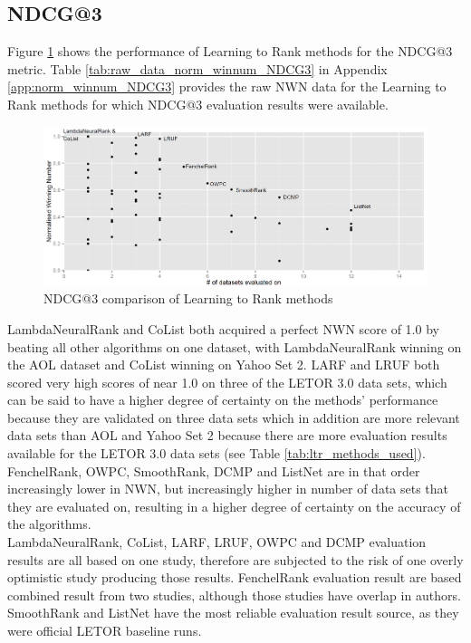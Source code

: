 \subsection{NDCG@3}
Figure \ref{fig:normalised_winning_number_NDCG3} shows the performance of Learning to Rank methods for the \ac{NDCG}@3 metric. Table \ref{tab:raw_data_norm_winnum_NDCG3} in Appendix \ref{app:norm_winnum_NDCG3} provides the raw \ac{NWN} data for the Learning to Rank methods for which \ac{NDCG}@3 evaluation results were available.\\

\begin{figure}[!h]
\includegraphics[scale=0.285]{gfx/ndcg3_winnum}
\caption{\acs{NDCG}@3 comparison of Learning to Rank methods}
\label{fig:normalised_winning_number_NDCG3}
\end{figure}

LambdaNeuralRank and CoList both acquired a perfect \ac{NWN} score of 1.0 by beating all other algorithms on one dataset, with LambdaNeuralRank winning on the AOL dataset and CoList winning on Yahoo Set 2. LARF and LRUF both scored very high scores of near 1.0 on three of the LETOR 3.0 data sets, which can be said to have a higher degree of certainty on the methods' performance because they are validated on three data sets which in addition are more relevant data sets than AOL and Yahoo Set 2 because there are more evaluation results available for the LETOR 3.0 data sets (see Table \ref{tab:ltr_methods_used}). FenchelRank, OWPC, SmoothRank, DCMP and ListNet are in that order increasingly lower in \ac{NWN}, but increasingly higher in number of data sets that they are evaluated on, resulting in a higher degree of certainty on the accuracy of the algorithms.\\

LambdaNeuralRank, CoList, LARF, LRUF, OWPC and DCMP evaluation results are all based on one study, therefore are subjected to the risk of one overly optimistic study producing those results. FenchelRank evaluation result are based combined result from two studies, although those studies have overlap in authors. SmoothRank and ListNet have the most reliable evaluation result source, as they were official LETOR baseline runs.  

